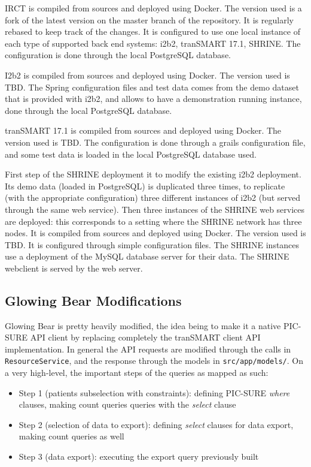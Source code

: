 IRCT is compiled from sources and deployed using Docker.
The version used is a fork of the latest version on the master branch of the repository. 
It is regularly rebased to keep track of the changes.
It is configured to use one local instance of each type of supported back end systems: i2b2, tranSMART 17.1, SHRINE.
The configuration is done through the local PostgreSQL database.

I2b2 is compiled from sources and deployed using Docker.
The version used is TBD.
The Spring configuration files and test data comes from the demo dataset that is provided with i2b2, and allows to have a demonstration running instance, done through the local PostgreSQL database.

tranSMART 17.1 is compiled from sources and deployed using Docker.
The version used is TBD.
The configuration is done through a grails configuration file, and some test data is loaded in the local PostgreSQL database used.

First step of the SHRINE deployment it to modify the existing i2b2 deployment.
Its demo data (loaded in PostgreSQL) is duplicated three times, to replicate (with the appropriate configuration) three different instances of i2b2 (but served through the same web service).
Then three instances of the SHRINE web services are deployed: this corresponds to a setting where the SHRINE network has three nodes.
It is compiled from sources and deployed using Docker. 
The version used is TBD.
It is configured through simple configuration files.
The SHRINE instances use a deployment of the MySQL database server for their data.
The SHRINE webclient is served by the web server.

\subsection{Glowing Bear Modifications}

Glowing Bear is pretty heavily modified, the idea being to make it a native PIC-SURE API client by replacing completely the tranSMART client API implementation. 
In general the API requests are modified through the calls in \verb|ResourceService|, and the response through the models in \verb|src/app/models/|.
On a very high-level, the important steps of the queries as mapped as such:
\begin{itemize}
    \item Step 1 (patients subselection with constraints): defining PIC-SURE \emph{where} clauses, making count queries queries with the \emph{select} clause
    \item Step 2 (selection of data to export): defining \emph{select} clauses for data export, making count queries as well
    \item Step 3 (data export): executing the export query previously built
\end{itemize}

